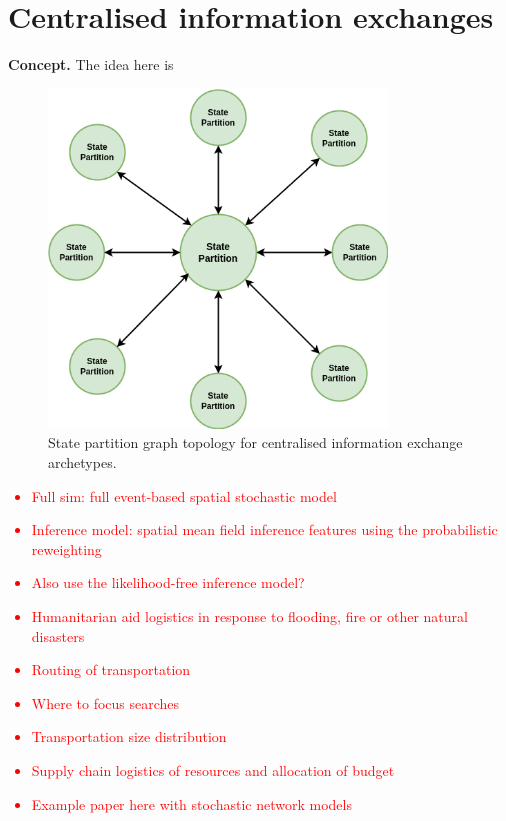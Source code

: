 \chapter{\sffamily Centralised information exchanges}

{\bfseries\sffamily Concept.} The idea here is 

\begin{figure}[h]
\centering
\includegraphics[width=9cm]{images/chapter-10-state-partition-graph.drawio.png}
\caption{State partition graph topology for centralised information exchange archetypes.}
\label{fig:state-partition-graph-centralised-information-exchanges}
\end{figure}

\textcolor{red}{
\begin{itemize}
\item{Full sim: full event-based spatial stochastic model}
\item{Inference model: spatial mean field inference features using the probabilistic reweighting }
\item{Also use the likelihood-free inference model?}
\end{itemize}
}

\textcolor{red}{
\begin{itemize}
\item{Humanitarian aid logistics in response to flooding, fire or other natural disasters}
\item{Routing of transportation}
\item{Where to focus searches}
\item{Transportation size distribution}
\item{Supply chain logistics of resources and allocation of budget}
\item{Example paper here with stochastic network models~\cite{alem2016stochastic}}
\end{itemize}
}